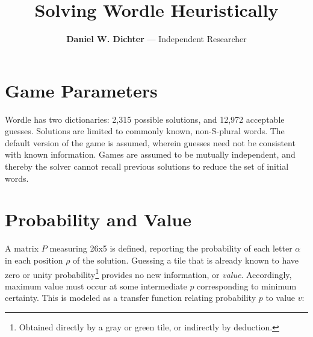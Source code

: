 \documentclass[twocolumn]{tudelft-aiaa}
\title{Solving Wordle Heuristically}
\author{\textbf{Daniel W. Dichter} --- Independent Researcher}
\affil{Cambridge, Massachusetts, U.S.A.\\daniel.w.dichter@gmail.com\\February 13, 2022}
\begin{document}


\section{Game Parameters}

Wordle has two dictionaries: 2,315 possible solutions, and 12,972 acceptable guesses.\cite{Wardle}\cite{Glaiel} Solutions are limited to commonly known, non-S-plural words. The default version of the game is assumed, wherein guesses need not be consistent with known information. Games are assumed to be mutually independent, and thereby the solver cannot recall previous solutions to reduce the set of initial words.

\section{Probability and Value}

A matrix $P$ measuring 26x5 is defined, reporting the probability of each letter $\alpha$ in each position $\rho$ of the solution. Guessing a tile that is already known to have zero or unity probability\footnote{Obtained directly by a gray or green tile, or indirectly by deduction.} provides no new information, or \emph{value}. Accordingly, maximum value must occur at some intermediate $p$ corresponding to minimum certainty. This is modeled as a transfer function relating probability $p$ to value $v$:
\end{document}
